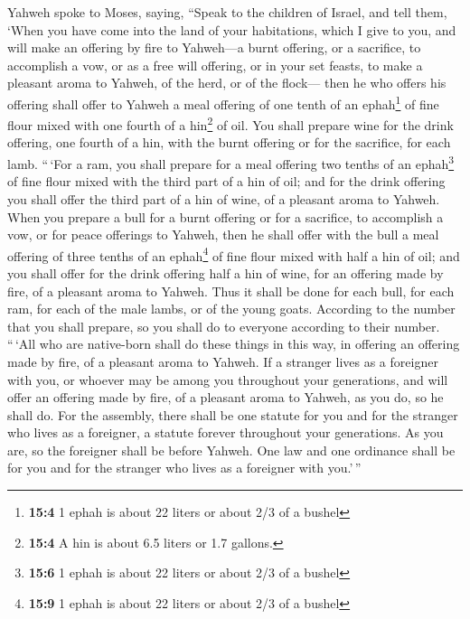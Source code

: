  Yahweh spoke to Moses, saying,  ``Speak to
the children of Israel, and tell them, `When you have come into the land
of your habitations, which I give to you,  and will make
an offering by fire to Yahweh---a burnt offering, or a sacrifice, to
accomplish a vow, or as a free will offering, or in your set feasts, to
make a pleasant aroma to Yahweh, of the herd, or of the flock---
 then he who offers his offering shall offer to Yahweh a
meal offering of one tenth of an ephah\footnote{\textbf{15:4} 1 ephah is
  about 22 liters or about 2/3 of a bushel} of fine flour mixed with one
fourth of a hin\footnote{\textbf{15:4} A hin is about 6.5 liters or 1.7
  gallons.} of oil.  You shall prepare wine for the drink
offering, one fourth of a hin, with the burnt offering or for the
sacrifice, for each lamb.  ``\,`For a ram, you shall
prepare for a meal offering two tenths of an ephah\footnote{\textbf{15:6}
  1 ephah is about 22 liters or about 2/3 of a bushel} of fine flour
mixed with the third part of a hin of oil;  and for the
drink offering you shall offer the third part of a hin of wine, of a
pleasant aroma to Yahweh.  When you prepare a bull for a
burnt offering or for a sacrifice, to accomplish a vow, or for peace
offerings to Yahweh,  then he shall offer with the bull a
meal offering of three tenths of an ephah\footnote{\textbf{15:9} 1 ephah
  is about 22 liters or about 2/3 of a bushel} of fine flour mixed with
half a hin of oil;  and you shall offer for the drink
offering half a hin of wine, for an offering made by fire, of a pleasant
aroma to Yahweh.  Thus it shall be done for each bull,
for each ram, for each of the male lambs, or of the young goats.
 According to the number that you shall prepare, so you
shall do to everyone according to their number.  ``\,`All
who are native-born shall do these things in this way, in offering an
offering made by fire, of a pleasant aroma to Yahweh.  If
a stranger lives as a foreigner with you, or whoever may be among you
throughout your generations, and will offer an offering made by fire, of
a pleasant aroma to Yahweh, as you do, so he shall do. 
For the assembly, there shall be one statute for you and for the
stranger who lives as a foreigner, a statute forever throughout your
generations. As you are, so the foreigner shall be before Yahweh.
 One law and one ordinance shall be for you and for the
stranger who lives as a foreigner with you.'\,''

